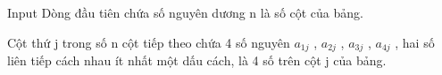 Input
Dòng đầu tiên chứa số nguyên dương n là số cột của bảng.

Cột thứ j trong số n cột tiếp theo chứa 4 số nguyên $a_{1j}$ , $a_{2j}$ , $a_{3j}$ , $a_{4j}$ , hai số liên tiếp cách nhau ít nhất một dấu cách, là 4 số trên cột j của bảng.
